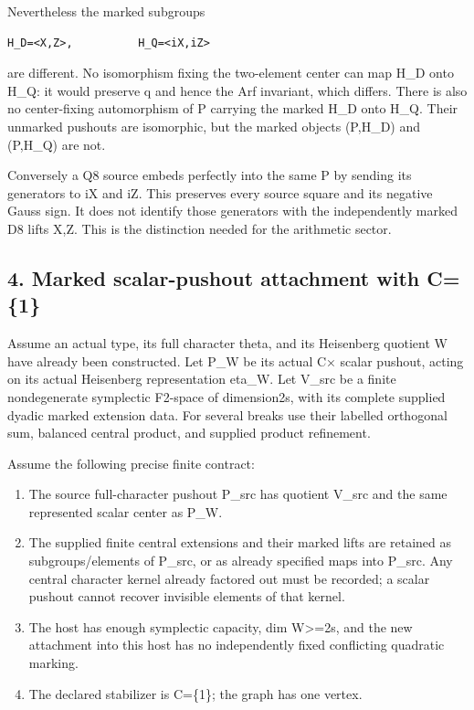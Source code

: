 Nevertheless the marked subgroups

\begin{Verbatim}[fontsize=\small,breaklines=true,breakanywhere=true]
H_D=<X,Z>,          H_Q=<iX,iZ>
\end{Verbatim}

are different. No isomorphism fixing the two-element center can map H\_D
onto H\_Q: it would preserve q and hence the Arf invariant, which
differs. There is also no center-fixing automorphism of P carrying the
marked H\_D onto H\_Q. Their unmarked pushouts are isomorphic, but the
marked objects (P,H\_D) and (P,H\_Q) are not.

Conversely a Q8 source embeds perfectly into the same P by sending its
generators to iX and iZ. This preserves every source square and its
negative Gauss sign. It does not identify those generators with the
independently marked D8 lifts X,Z. This is the distinction needed for
the arithmetic sector.

\hypertarget{dyadic_markings-marked-scalar-pushout-attachment-with-c1}{%
\subsection{4. Marked scalar-pushout attachment with
C=\{1\}}\label{dyadic_markings-marked-scalar-pushout-attachment-with-c1}}

Assume an actual type, its full character theta, and its Heisenberg
quotient W have already been constructed. Let P\_W be its actual C×
scalar pushout, acting on its actual Heisenberg representation eta\_W.
Let V\_src be a finite nondegenerate symplectic F2-space of dimension2s,
with its complete supplied dyadic marked extension data. For several
breaks use their labelled orthogonal sum, balanced central product, and
supplied product refinement.

Assume the following precise finite contract:

\begin{enumerate}
\def\labelenumi{\arabic{enumi}.}
\tightlist
\item
  The source full-character pushout P\_src has quotient V\_src and the
  same represented scalar center as P\_W.
\item
  The supplied finite central extensions and their marked lifts are
  retained as subgroups/elements of P\_src, or as already specified maps
  into P\_src. Any central character kernel already factored out must be
  recorded; a scalar pushout cannot recover invisible elements of that
  kernel.
\item
  The host has enough symplectic capacity, dim W\textgreater=2s, and the
  new attachment into this host has no independently fixed conflicting
  quadratic marking.
\item
  The declared stabilizer is C=\{1\}; the graph has one vertex.
\end{enumerate}

